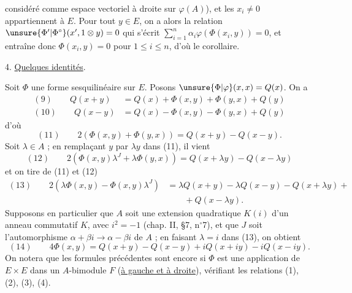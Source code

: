 considéré comme espace vectoriel à droite sur $\varphi(A)$), et les $x_i\ne0$ appartiennent à $E$. Pour tout $y\in E$, on a alors la relation $\unsure{\Phi'|\Phi^\circ}(x',1\otimes y)=0$ qui s'écrit $\sum_{i=1}^n\alpha_i\varphi(\Phi(x_i,y))=0$, et entraîne donc $\Phi(x_i,y)=0$ pour $1\le i\le n$, d'où le corollaire.

4. \uline{Quelques identités}.

Soit $\Phi$ une forme sesquilinéaire sur $E$. Posons $\unsure{\Phi|\varphi}(x,x)=Q(x)$. On a
\[
\begin{aligned}
(9)\qquad Q(x+y)&=Q(x)+\Phi(x,y)+\Phi(y,x)+Q(y)\\
(10)\qquad Q(x-y)&=Q(x)-\Phi(x,y)-\Phi(y,x)+Q(y)
\end{aligned}
\]
d'où
\[
(11)\qquad 2(\Phi(x,y)+\Phi(y,x))=Q(x+y)-Q(x-y).
\]
Soit $\lambda\in A$ ; en remplaçant $y$ par $\lambda y$ dans (11), il vient
\[
(12)\qquad 2(\Phi(x,y)\lambda^J+\lambda\Phi(y,x))=Q(x+\lambda y)-Q(x-\lambda y)
\]
et on tire de (11) et (12)
\[
\begin{aligned}
(13)\qquad 2(\lambda\Phi(x,y)-\Phi(x,y)\lambda^J)
&=\lambda Q(x+y)-\lambda Q(x-y)-Q(x+\lambda y)+{}\\
&\qquad{}+Q(x-\lambda y).
\end{aligned}
\]
Supposons en particulier que $A$ soit une extension quadratique $K(i)$ d'un anneau commutatif $K$, avec $i^2=-1$ (chap. II, \S 7, n$^\circ$7), et que $J$ soit l'automorphisme $\alpha+\beta i\longrightarrow\alpha-\beta i$ de $A$ ; en faisant $\lambda=i$ dans (13), on obtient
\[
(14)\qquad 4\Phi(x,y)=Q(x+y)-Q(x-y)+iQ(x+iy)-iQ(x-iy).
\]
On notera que les formules précédentes sont encore  si $\Phi$ est une application de $E\times E$ dans un $A$-bimodule $F$ (\uline{à gauche et à droite}), vérifiant les relations (1), (2), (3), (4).
